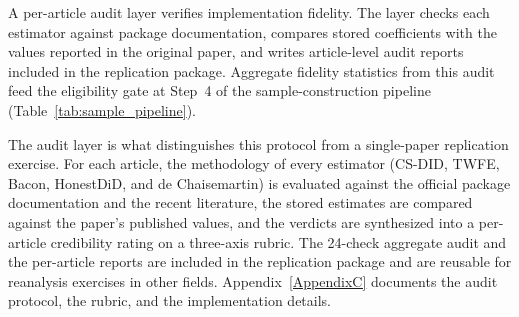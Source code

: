 \documentclass[11pt]{article}
\begin{document}
A per-article audit layer verifies implementation fidelity. The layer checks each estimator against package documentation, compares stored coefficients with the values reported in the original paper, and writes article-level audit reports included in the replication package. Aggregate fidelity statistics from this audit feed the eligibility gate at Step~4 of the sample-construction pipeline (Table~\ref{tab:sample_pipeline}).

The audit layer is what distinguishes this protocol from a single-paper replication exercise. For each article, the methodology of every estimator (CS-DID, TWFE, Bacon, HonestDiD, and de Chaisemartin) is evaluated against the official package documentation and the recent literature, the stored estimates are compared against the paper's published values, and the verdicts are synthesized into a per-article credibility rating on a three-axis rubric. The 24-check aggregate audit and the per-article reports are included in the replication package and are reusable for reanalysis exercises in other fields. Appendix~\ref{AppendixC} documents the audit protocol, the rubric, and the implementation details.
\end{document}
